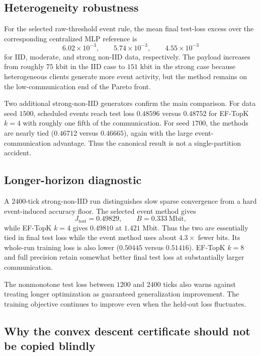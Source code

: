 \subsection{Heterogeneity robustness}

For the selected raw-threshold event rule, the mean final test-loss excess over the corresponding centralized MLP reference is
\begin{equation}
  6.02\times10^{-3},\qquad
  5.74\times10^{-3},\qquad
  4.55\times10^{-3}
\end{equation}
for IID, moderate, and strong non-IID data, respectively. The payload increases from roughly $75$ kbit in the IID case to $151$ kbit in the strong case because heterogeneous clients generate more event activity, but the method remains on the low-communication end of the Pareto front.

Two additional strong-non-IID generators confirm the main comparison. For data seed $1500$, scheduled events reach test loss $0.48596$ versus $0.48752$ for EF-TopK $k=4$ with roughly one fifth of the communication. For seed $1700$, the methods are nearly tied ($0.46712$ versus $0.46665$), again with the large event-communication advantage. Thus the canonical result is not a single-partition accident.

\subsection{Longer-horizon diagnostic}

A $2400$-tick strong-non-IID run distinguishes slow sparse convergence from a hard event-induced accuracy floor. The selected event method gives
\begin{equation}
  J_{\mathrm{test}}=0.49829,
  \qquad
  B=0.333\ \text{Mbit},
\end{equation}
while EF-TopK $k=4$ gives $0.49810$ at $1.421$ Mbit. Thus the two are essentially tied in final test loss while the event method uses about $4.3\times$ fewer bits. Its whole-run training loss is also lower ($0.50445$ versus $0.51416$). EF-TopK $k=8$ and full precision retain somewhat better final test loss at substantially larger communication.

The nonmonotone test loss between $1200$ and $2400$ ticks also warns against treating longer optimization as guaranteed generalization improvement. The training objective continues to improve even when the held-out loss fluctuates.

\subsection{Why the convex descent certificate should not be copied blindly}

